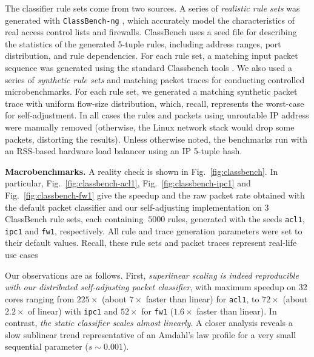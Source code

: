 The classifier rule sets come from two sources. A series of \emph{realistic rule sets} was generated with \texttt{ClassBench-ng} \cite{10.1109/ANCS.2017.33, 4237157}, which accurately model the characteristics of real access control lists and firewalls. ClassBench uses a seed file for describing the statistics of the generated 5-tuple rules, including address ranges, port distribution, and rule dependencies. %
For each rule set, a matching input packet sequence was generated using the standard Classbench tools \cite{10.1109/ANCS.2017.33,classbench-pcap}. We also used a series of \emph{synthetic rule sets} and matching packet traces for conducting controlled microbenchmarks. For each rule set, we generated a matching synthetic packet trace with uniform flow-size distribution, which, recall, represents the worst-case for self-adjustment.  In all cases the rules and packets using unroutable IP address were manually removed (otherwise, the Linux network stack would drop some packets, distorting the results). Unless otherwise noted, the benchmarks run with an RSS-based hardware load balancer using an IP 5-tuple hash.

\noindent
\textbf{Macrobenchmarks.} %
A reality check is shown in Fig.~\ref{fig:classbench}. In particular, Fig.~\ref{fig:classbench-acl1}, Fig.~\ref{fig:classbench-ipc1} and Fig.~\ref{fig:classbench-fw1} give the speedup and the raw packet rate obtained with the default \nftables packet classifier and our self-adjusting implementation on 3 ClassBench rule sets, each containing $~5000$ rules, generated with the seeds \texttt{acl1}, \texttt{ipc1} and \texttt{fw1}, respectively. All rule and trace generation parameters were set to their default values. Recall, these rule sets and packet traces represent real-life use cases

Our observations are as follows. First, \emph{superlinear scaling is indeed reproducible with our distributed self-adjusting packet classifier}, with maximum speedup on 32 cores ranging from $225\times$ (about $7\times$ faster than linear) for \texttt{acl1}, to $72\times$ (about $2.2\times$ of linear) with \texttt{ipc1} and $52\times$ for \texttt{fw1} ($1.6\times$ faster than linear). In contrast, \emph{the static \nftables classifier scales almost linearly}. A closer analysis reveals a slow sublinear trend representative of an Amdahl's law profile for a very small sequential parameter ($s\sim 0.001$).


